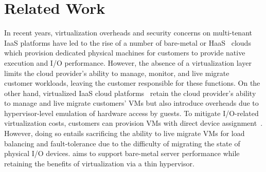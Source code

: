 
\section{Related Work}
In recent years, virtualization overheads and security concerns on 
multi-tenant IaaS platforms have led to the rise of a 
number of bare-metal or HaaS~\cite{softlayer,oracle,zenlayer,vultr,m2}
clouds which provision dedicated physical machines for customers
to provide native execution and I/O performance.
However, the absence of a virtualization layer 
limits the cloud provider's ability to manage, monitor, 
and live migrate~\cite{clark:2005,postcopy-osr}
customer workloads, leaving the customer responsible for 
these functions.
On the other hand, virtualized IaaS cloud platforms~\cite{gcp,azure,ec2}
retain the cloud provider's ability to manage and live migrate customers'
VMs but also introduce overheads  due to
hypervisor-level emulation of hardware access by guests. To mitigate I/O-related 
virtualization costs, customers can provision VMs with 
direct device assignment~\cite{intelvtd}. 
However, doing so entails sacrificing the ability 
to live migrate VMs for load balancing and fault-tolerance
due to the difficulty of migrating the state of physical I/O devices.
\na aims to  support bare-metal server performance
while retaining the benefits of virtualization via a 
thin hypervisor.

